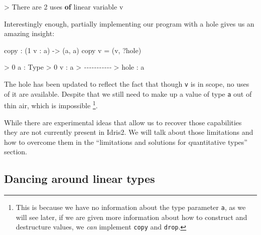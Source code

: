 \documentclass[
]{article}
\newenvironment{Shaded}{}{}
\newcommand{\CommentTok}[1]{\textcolor[rgb]{0.38,0.63,0.69}{\textit{#1}}}
\newcommand{\DataTypeTok}[1]{\textcolor[rgb]{0.56,0.13,0.00}{#1}}
\newcommand{\DecValTok}[1]{\textcolor[rgb]{0.25,0.63,0.44}{#1}}
\newcommand{\KeywordTok}[1]{\textcolor[rgb]{0.00,0.44,0.13}{\textbf{#1}}}
\newcommand{\NormalTok}[1]{#1}
\newcommand{\OperatorTok}[1]{\textcolor[rgb]{0.40,0.40,0.40}{#1}}
\newcommand{\OtherTok}[1]{\textcolor[rgb]{0.00,0.44,0.13}{#1}}
\begin{document}
\begin{Shaded}
\begin{Highlighting}[]
\OperatorTok{\textgreater{}} \DataTypeTok{There}\NormalTok{ are }\DecValTok{2}\NormalTok{ uses }\KeywordTok{of}\NormalTok{ linear variable v}
\end{Highlighting}
\end{Shaded}

Interestingly enough, partially implementing our program with a hole
gives us an amazing insight:

\begin{Shaded}
\begin{Highlighting}[]
\NormalTok{copy }\OperatorTok{:}\NormalTok{ (}\DecValTok{1}\NormalTok{ v }\OperatorTok{:}\NormalTok{ a) }\OtherTok{{-}\textgreater{}}\NormalTok{ (a, a)}
\NormalTok{copy v }\OtherTok{=}\NormalTok{ (v, }\OperatorTok{?}\NormalTok{hole)}
\end{Highlighting}
\end{Shaded}

\begin{Shaded}
\begin{Highlighting}[]
\OperatorTok{\textgreater{}} \DecValTok{0}\NormalTok{ a }\OperatorTok{:} \DataTypeTok{Type}
\OperatorTok{\textgreater{}} \DecValTok{0}\NormalTok{ v }\OperatorTok{:}\NormalTok{ a}
\OperatorTok{\textgreater{}} \CommentTok{{-}{-}{-}{-}{-}{-}{-}{-}{-}{-}{-}}
\OperatorTok{\textgreater{}}\NormalTok{ hole }\OperatorTok{:}\NormalTok{ a}
\end{Highlighting}
\end{Shaded}

The hole has been updated to reflect the fact that though \texttt{v} is
in scope, no uses of it are available. Despite that we still need to
make up a value of type \texttt{a} out of thin air, which is impossible
\footnote{This is because we have no information about the type
  parameter \texttt{a}, as we will see later, if we are given more
  information about how to construct and destructure values, we
  \emph{can} implement \texttt{copy} and \texttt{drop}.}.

While there are experimental ideas that allow us to recover those
capabilities they are not currently present in Idris2. We will talk
about those limitations and how to overcome them in the ``limitations
and solutions for quantitative types'' section.

\hypertarget{dancing-around-linear-types}{%
\subsection{Dancing around linear
types}\label{dancing-around-linear-types}}
\end{document}
